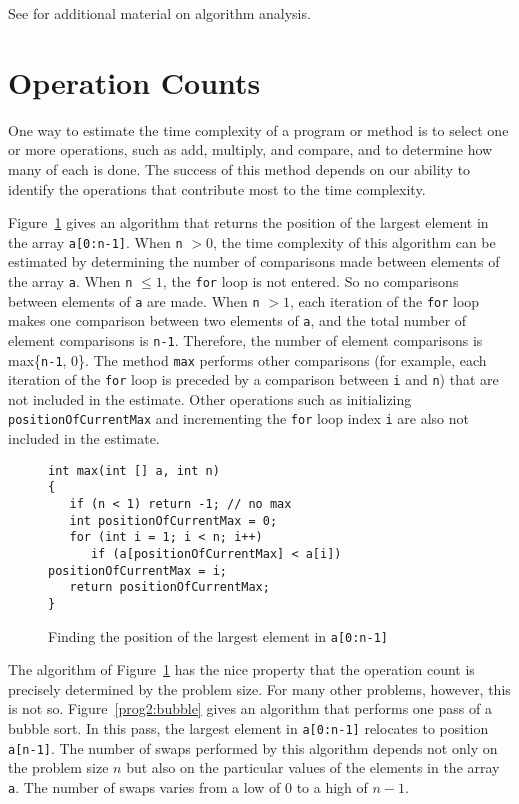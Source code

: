 See \cite{cormen,horo,rawl,sahni}
for additional material on algorithm analysis. 

\section{Operation Counts}
One way
to estimate the time complexity of a program or method is to
select one or more operations, such as add, multiply, and compare, and
to determine
how many of each is done.
The success of this method depends on our ability to identify
the operations that contribute most to the time complexity.

 
\begin{example}
\label{E2:max}
Figure~\ref{prog1:max} gives an algorithm
that returns the position of the largest
element
in the array {\tt a[0:n-1]}.  When {\tt n} $> 0$,
the time complexity of this algorithm can be estimated
by determining the number of comparisons
made between elements of the array {\tt a}.
When {\tt n} $\leq 1$, the {\tt for} loop is not entered.
So no comparisons between elements of {\tt a} are made.
When {\tt n} $> 1$,
each iteration of the {\tt for} loop makes one comparison between
two elements of {\tt a},
and the total number of element comparisons is {\tt n-1}.
Therefore, the number of element comparisons is
max\{{\tt n-1}, 0\}.
The method {\tt max}
performs other comparisons (for example, each iteration of the {\tt for}
loop is preceded by a comparison between {\tt i} and {\tt n}) that
are not included
in the estimate.  Other operations such as
initializing {\tt positionOfCurrentMax} and incrementing
the {\tt for} loop index {\tt i} are also not included in the estimate.
\end{example}

\begin{figure}
\begin{verbatim}
int max(int [] a, int n)
{
   if (n < 1) return -1; // no max
   int positionOfCurrentMax = 0;
   for (int i = 1; i < n; i++)
      if (a[positionOfCurrentMax] < a[i]) positionOfCurrentMax = i;
   return positionOfCurrentMax;
}
\end{verbatim}
\caption{Finding the position of the largest element in {\tt a[0:n-1]}
\label {prog1:max}}
\end{figure}
 
The algorithm of Figure~\ref{prog1:max} has the nice property that the operation
count is precisely determined by the problem size. For many other problems,
however, this is not so.
Figure~\ref{prog2:bubble} gives an algorithm that performs
one pass of a bubble sort. In this pass,
the largest element in {\tt a[0:n-1]} relocates to position {\tt a[n-1]}.
The number of swaps
performed by this algorithm
depends not only on the problem
size $n$ but also on
the particular values of the elements in the array
{\tt a}.  The number of swaps varies from a low of
$0$ to a high of $n  -  1$.


